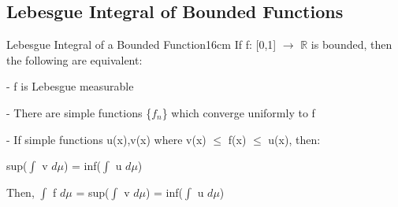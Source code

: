     \vspace{0.5cm}





\subsection{ Lebesgue Integral of Bounded Functions }

    \begin{wtheorem}{Lebesgue Integral of a Bounded Function}{16cm}
        If f: [0,1] $\rightarrow$ $\mathbb{R}$ is bounded, then
        the following are equivalent:

        \hspace{0.5cm}
        - f is Lebesgue measurable

        \hspace{0.5cm}
        - There are simple functions \{$f_n$\} which converge uniformly to f

        \hspace{0.5cm}
        - If simple functions u(x),v(x) where v(x) $\leq$ f(x) $\leq$ u(x), then:

        \hspace{1cm}
        sup($\int$ v $d\mu$) = inf($\int$ u $d\mu$)

        Then, $\int$ f $d\mu$ = sup($\int$ v $d\mu$) = inf($\int$ u $d\mu$)
    \end{wtheorem}

